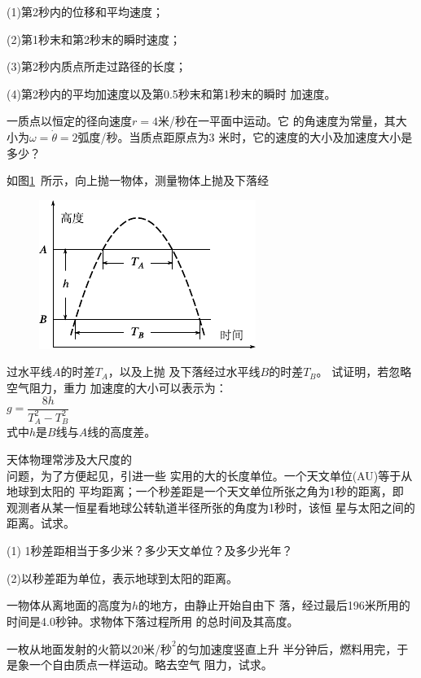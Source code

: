\begin{exercises}
(1)第2秒内的位移和平均速度；

(2)第1秒末和第2秒末的瞬时速度；

(3)第2秒内质点所走过路径的长度；

(4)第2秒内的平均加速度以及第0.5秒末和第1秒末的瞬时
加速度。

\exercise 一质点以恒定的径向速度$r=4$米/秒在一平面中运动。它
的角速度为常量，其大小为$\omega=\dot\theta=2$弧度/秒。当质点距原点为3
米时，它的速度的大小及加速度大小是多少？

{
\exercise 如图\ref{fig:01.29}~所示，向上抛一物体，测量物体上抛及下落经
\begin{figure}
  \vspace{1em}
  \begin{center}
    \includegraphics{figure/fig01.29}
    \caption{}
    \label{fig:01.29}
  \end{center}
\end{figure}
过水平线$A$的时差$T_A$，以及上抛
及下落经过水平线$B$的时差$T_B$。
试证明，若忽略空气阻力，重力
加速度的大小可以表示为：\\
\null\hspace{3em}$g=\dfrac{8h}{T_A^2 - T_B^2}$ \\
式中$h$是$B$线与$A$线的高度差。}

\exercise 天体物理常涉及大尺度的\\
问题，为了方便起见，引进一些
\clearpage
\noindent 实用的大的长度单位。一个天文单位(AU)等于从地球到太阳的
平均距离；一个秒差距是一个天文单位所张之角为1秒的距离，即
观测者从某一恒星看地球公转轨道半径所张的角度为1秒时，该恒
星与太阳之间的距离。试求。

(1) 1秒差距相当于多少米？多少天文单位？及多少光年？

(2)以秒差距为单位，表示地球到太阳的距离。

\exercise 一物体从离地面的高度为$ h $的地方，由静止开始自由下
落，经过最后196米所用的时间是4.0秒钟。求物体下落过程所用
的总时间及其高度。

\exercise 一枚从地面发射的火箭以20米/$\text{秒}^2$的匀加速度竖直上升
半分钟后，燃料用完，于是象一个自由质点一样运动。略去空气
阻力，试求。


\end{exercises}
